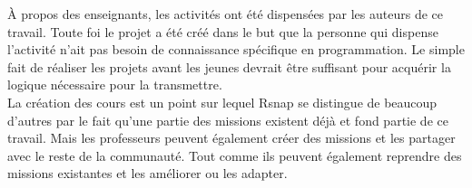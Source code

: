 À propos des enseignants, les activités ont été dispensées par les auteurs de ce travail. Toute foi le projet a été créé dans le but que la personne qui dispense l'activité n'ait pas besoin de connaissance spécifique en programmation. Le simple fait de réaliser les projets avant les jeunes devrait être suffisant pour acquérir la logique nécessaire pour la transmettre.\\

La création des cours est un point sur lequel Rsnap se distingue de beaucoup d'autres par le fait qu'une partie des missions existent déjà et fond partie de ce travail. Mais les professeurs peuvent également créer des missions et les partager avec le reste de la communauté. Tout comme ils peuvent également reprendre des missions existantes et les améliorer ou les adapter. %